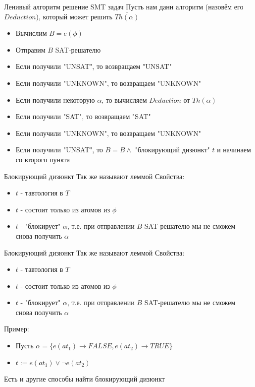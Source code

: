 \documentclass{beamer}
\begin{document}
\begin{frame}{Ленивый алгоритм решение SMT задач}
Пусть нам данн алгоритм (назовём его $Deduction$), который может решить $\overline{Th(\alpha)}$
\begin{itemize}
\item Вычислим $B = e(\phi)$
\item Отправим $B$ SAT-решателю
\item Если получили "UNSAT", то возвращаем "UNSAT"
\item Если получили "UNKNOWN", то возвращаем "UNKNOWN"
\item Если получили некоторую $\alpha$, то вычисляем $Deduction$ от $\overline{Th(\alpha)}$
\item Если получили "SAT", то возвращаем "SAT"
\item Если получили "UNKNOWN", то возвращаем "UNKNOWN"
\item Если получили "UNSAT", то $B = B \wedge$ "блокирующий дизюнкт" $t$ и начинаем со второго пункта
\end{itemize}
\end{frame}

\begin{frame}{Блокирующий дизюнкт}
Так же называют леммой\newline
Свойства:
\begin{itemize}
\item $t$ - тавтология в $T$
\item $t$ - состоит только из атомов из $\phi$
\item $t$ - "блокирует" $\alpha$, т.е. при отправлении $B$ SAT-решателю мы не сможем снова получить $\alpha$
\end{itemize}
\end{frame}

\begin{frame}{Блокирующий дизюнкт}
Так же называют леммой\newline
Свойства:
\begin{itemize}
\item $t$ - тавтология в $T$
\item $t$ - состоит только из атомов из $\phi$
\item $t$ - "блокирует" $\alpha$, т.е. при отправлении $B$ SAT-решателю мы не сможем снова получить $\alpha$
\end{itemize}
Пример:
\begin{itemize}
\item Пусть $\alpha = \{e(at_1) \rightarrow FALSE, e(at_2) \rightarrow TRUE\}$
\item $t := e(at_1) \vee \lnot e(at_2)$
\end{itemize}
Есть и другие способы найти блокирующий дизюнкт
\end{frame}
\end{document}
